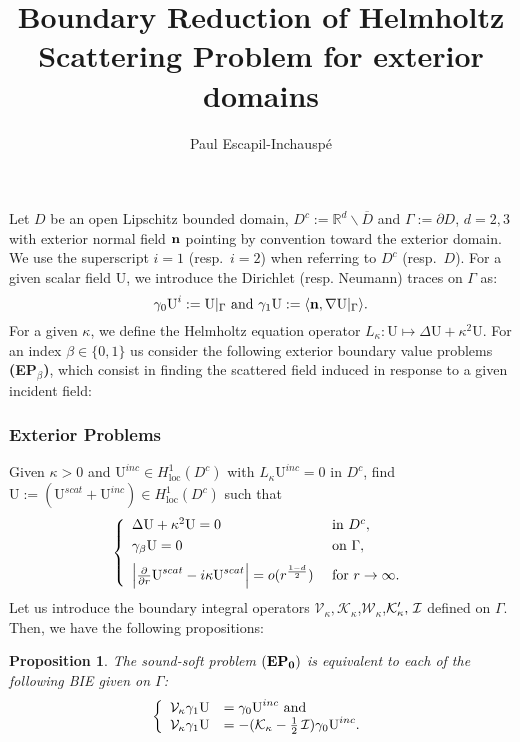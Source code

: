 \documentclass[1pt]{article}
\title{Boundary Reduction of Helmholtz Scattering Problem for exterior domains}
\author{Paul Escapil-Inchausp\'e}
\newcommand{\be}{\begin{equation}}
\newcommand{\ee}{\end{equation}}
\newcommand{\IR}{\mathbb{R}}
\newcommand{\bn}{{\bf n}}
\newcommand{\mK}{\mathcal{K}}
\newcommand{\mI}{\nobreak\hspace{.16667em plus .08333em}\mathcal{I}}
\newcommand{\mV}{\mathcal{V}}
\newcommand{\mW}{\mathcal{W}}
\newcommand{\U}{{\text{U}}}
\newtheorem{proposition}{Proposition}
\begin{document}
\maketitle

Let $D$ be an open Lipschitz bounded domain, $D^c:=\IR^d\backslash \overline{D}$ and $\Gamma:=\partial D$, $d=2,3$ with exterior normal field $\bn$ pointing by convention toward the exterior domain. We use the superscript $i=1$ (resp.~$i=2$) when referring to $D^c$ (resp.~$D$). For a given scalar field $\U$, we introduce the Dirichlet (resp. Neumann) traces on $\Gamma$ as:
\be
\gamma_0 \U^i:= \U|_\Gamma \text{ and } \gamma_1 \U:= \langle \bn, \nabla \U|_\Gamma  \rangle.
\ee
For a given $\kappa$, we define the Helmholtz equation operator $L_\kappa:\U \mapsto \Delta \U + \kappa^2 \U$. For an index $\beta \in \{0,1\}$ us consider the following exterior boundary value problems {\bf (EP$_\beta$)}, which consist in finding the scattered field induced in response to a given incident field:

\subsubsection*{Exterior Problems}
\label{subsubs:EP_0}
Given $\kappa>0$ and $\U^{inc} \in H_{\text{loc}}^1(D^c)$ with $L_\kappa \U^{inc}=0$ in $D^c$, find $\U:=(\U^{scat}+\U^{inc}) \in H_{\text{loc}}^1(D^c)$ such that
\be
\left\{
\label{eq:EP_0}
\begin{array}{ll}
\Delta\U+\kappa^2\U  = 0&\text{ in } D^c,\\
\noalign{\vspace{3pt}}
  \gamma_{\beta} \U = 0&\text{ on } \Gamma,\\
  \noalign{\vspace{6pt}}
   \Big|\frac{\partial}{\partial r} \U^{scat}-i\kappa \U^{scat}\Big| = o(r^{\frac{1-d}{2}}) &\text{ for } r \to \infty.
\end{array}
\right.
\ee
Let us introduce the boundary integral operators $\mV_\kappa,\mK_\kappa$,$\mW_\kappa$,$\mK_\kappa',\mI$ defined on $\Gamma$.
Then, we have the following propositions:
\begin{proposition}
The \emph{sound-soft} problem ${\bf (EP_0)}$ is equivalent to each of the following BIE given on $\Gamma$:
\be
\left\{
\label{eq:B_EP_0}
\begin{array}{ll}
\mathcal{V}_\kappa \gamma_1 \U &= \gamma_0 \U^{inc}\text{ and }\\
\mathcal{V}_\kappa \gamma_1 \U &= -(\mathcal{K}_\kappa-\frac{1}{2}\mI) \gamma_0 \U^{inc}.
\end{array}
\right.
\ee
\end{proposition}
\end{document}
